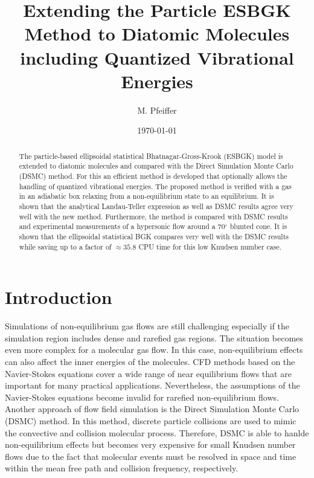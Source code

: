 \documentclass[aip,pof,amsmath,amssymb,preprint]{revtex4-1}
\begin{document}
\title[A Particle-based ESBGK Method for Diatomic Molecules]{Extending the Particle ESBGK Method to Diatomic Molecules including Quantized Vibrational Energies} 

\author{M. Pfeiffer}
%

\date{\today}%

\begin{abstract}
The particle-based ellipsoidal statistical Bhatnagar-Gross-Krook (ESBGK) model 
is extended to diatomic molecules and compared with the Direct Simulation Monte Carlo (DSMC) method. 
For this an efficient method is developed that optionally allows the handling of quantized vibrational energies.
The proposed method is verified with a gas in an adiabatic box relaxing from a non-equilibrium state to an equilibrium.
It is shown that the analytical Landau-Teller expression as well as DSMC results agree very well with the new method. 
Furthermore, the method is compared with DSMC results and experimental measurements of a hypersonic
flow around a 70$^\circ$ blunted cone. 
It is shown that the ellipsoidal statistical BGK compares very well with the DSMC results while saving up to a factor of $\approx 35.8$ CPU time for this low Knudsen
number case.
\end{abstract}


\maketitle
\section{Introduction}
Simulations of non-equilibrium gas flows are still challenging especially if the simulation region includes dense and rarefied gas regions. The situation becomes even more complex for a molecular
gas flow. In this case, non-equilibrium effects can also affect the inner energies of the molecules. CFD methods based on the Navier-Stokes equations cover a wide range of near equilibrium flows that 
are important for many practical applications. Nevertheless, the assumptions of the Navier-Stokes equations become invalid for rarefied non-equilibrium flows. Another approach of flow field simulation
is the Direct Simulation Monte Carlo (DSMC) method. In this method, discrete particle collisions are used to mimic the convective and collision molecular process\cite{Bird1994}. Therefore, DSMC is able to 
hanlde non-equilibrium effects but becomes very expensive for small Knudsen number flows due to the fact that molecular events must be resolved in space and time within the mean free path and collision frequency, respectively.
\end{document}
